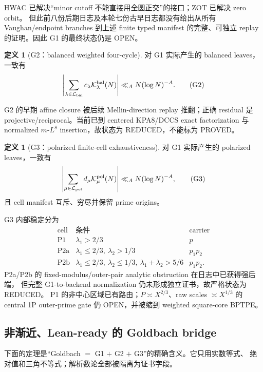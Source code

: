 \documentclass[11pt,a4paper]{ctexart}
\theoremstyle{definition}
\newtheorem{definition}[theorem]{定义}
\newcommand{\1}{\mathbf 1}
\newcommand{\K}{\mathcal K}
\newcommand{\LL}{\mathcal L}
\newcommand{\OPEN}{\textcolor{red!70!black}{\textsf{OPEN}}}
\newcommand{\REDUCED}{\textcolor{orange!80!black}{\textsf{REDUCED}}}
\begin{document}
HWAC 已解决“minor cutoff 不能直接用全圆正交”的接口；ZOT 已解决 zero orbit。
但此前八份后期日志及本轮七份古早日志都没有给出从所有 Vaughan/endpoint branches 到上述 finite typed manifest
的完整、可独立 replay 的证明。因此 G1 的最终状态仍是 \OPEN。

\begin{definition}[G2：balanced weighted four-cycle]
对 G1 实际产生的 balanced leaves，一致有
\[
\left|\sum_{\lambda\in\LL_{\rm bal}}c_\lambda
\K_\lambda^{\rm bal}(N)\right|
\ll_A N(\log N)^{-A}.                                  \tag{G2}
\]
\end{definition}

G2 的早期 affine closure 被后续 Mellin-direction replay 推翻；正确 residual 是
projective/reciprocal。当前已到 centered KPA8/DCCS exact factorization 与
normalized $m$-$L^8$ insertion，故状态为 \REDUCED，不能标为 PROVED。

\begin{definition}[G3：polarized finite-cell exhaustiveness]
对 G1 实际产生的 polarized leaves，一致有
\[
\left|\sum_{\mu\in\LL_{\rm pol}}d_\mu
\K_\mu^{\rm pol}(N)\right|
\ll_A N(\log N)^{-A},                                  \tag{G3}
\]
且 cell manifest 互斥、穷尽并保留 prime origins。
\end{definition}

G3 内部稳定分为
\[
\begin{array}{c|c|c}
\text{cell}&\text{条件}&\text{carrier}\\ \hline
\mathrm{P1}&\lambda_1>2/3&p\\
\mathrm{P2a}&\lambda_1\le2/3,\ \lambda_2>1/3&p_1p_2\\
\mathrm{P2b}&\lambda_1\le2/3,\ \lambda_2\le1/3,
\ \lambda_1+\lambda_2>5/6&p_1p_2.
\end{array}                                             \tag{5.1}
\]
P2a/P2b 的 fixed-modulus/outer-pair analytic obstruction 在日志中已获得强后端，
但完整 G1-to-backend normalization 仍未形成独立证书，故严格状态为 \REDUCED。
P1 的非中心区域已有路由；$P\asymp X^{2/3}$、raw scales $\asymp X^{1/3}$
的 central 1P outer-prime gate 仍 \OPEN，并被缩到 weighted square-core BPTPE。

\subsection{非渐近、Lean-ready 的 Goldbach bridge}

下面的定理是“Goldbach $=$ G1 $+$ G2 $+$ G3”的精确含义。它只用实数等式、
绝对值和三角不等式；解析数论全部被隔离为证书字段。
\end{document}
